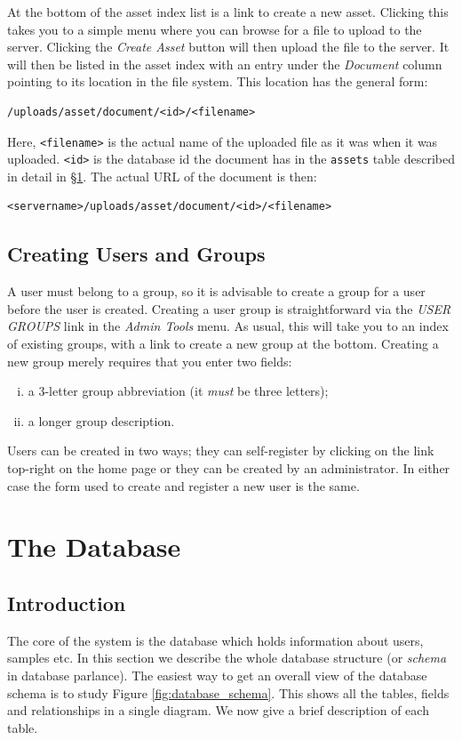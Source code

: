\documentclass[12pt]{article}
\begin{document}
At the bottom of the asset index list is a link to create a new asset.
Clicking this takes you to a simple menu where you can browse for a file
to upload to the server. Clicking the \emph{Create Asset} button will
then upload the file to the server. It will then be listed in the
asset index with an entry under the \emph{Document} column pointing
to its location in the file system. This location has the general form:
\begin{verbatim}
/uploads/asset/document/<id>/<filename>
\end{verbatim}
Here, \verb=<filename>= is the actual name of the uploaded file as it was
when it was uploaded. \verb=<id>= is the database id the document has
in the \verb=assets= table described in detail in \S\ref{sec:database}.
The actual URL of the document is then:
\begin{verbatim}
<servername>/uploads/asset/document/<id>/<filename>
\end{verbatim}

\subsection{Creating Users and Groups}
A user must belong to a group, so it is advisable to create a group for a
user before the user is created. Creating a user group is straightforward
via the \emph{USER GROUPS} link in the \emph{Admin Tools} menu.
As usual, this will take you to an index of existing groups, with a link
to create a new group at the bottom. Creating a new group merely requires
that you enter two fields:
\begin{enumerate}[(i)]
\item
a 3-letter group abbreviation (it \emph{must} be three letters);
\item
a longer group description.
\end{enumerate}

Users can be created in two ways; they can self-register by clicking
on the link top-right on the home page or they can be created by an
administrator. In either case the form used to create and register a new
user is the same.


\section{The Database}\label{sec:database}
\subsection{Introduction}
The core of the system is the database which holds information about 
users, samples etc. In this section we describe the whole database
structure (or \emph{schema} in database parlance).
The easiest way to get an overall view of the database schema is to
study Figure \ref{fig:database_schema}. This shows
all the tables, fields and relationships in a single diagram.
We now give a brief description of each table.
\end{document}
